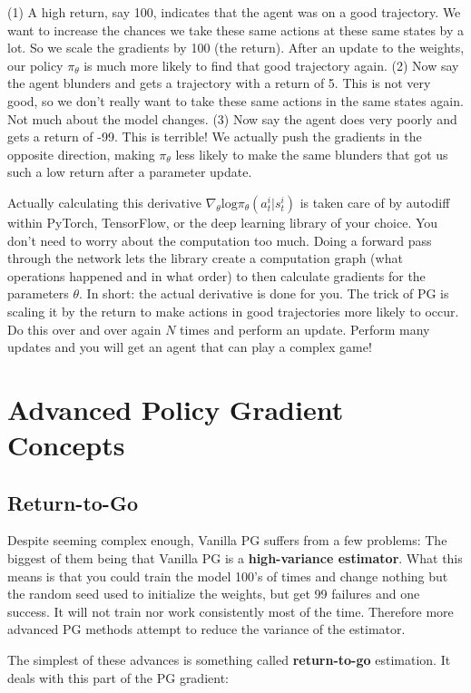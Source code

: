     (1) A high return, say 100, indicates that the agent was on a good trajectory. We want to increase the chances we take these same actions at these same states by a lot. So we scale the gradients by 100 (the return). After an update to the weights, our policy $\pi_\theta$ is much more likely to find that good trajectory again. (2) Now say the agent blunders and gets a trajectory with a return of 5. This is not very good, so we don't really want to take these same actions in the same states again. Not much about the model changes. (3) Now say the agent does very poorly and gets a return of -99. This is terrible! We actually push the gradients in the opposite direction, making $\pi_\theta$ less likely to make the same blunders that got us such a low return after a parameter update. 

    Actually calculating this derivative $\nabla_\theta \mathrm{log}\pi_\theta(a_t^i|s_t^i)$ is taken care of by autodiff within PyTorch, TensorFlow, or the deep learning library of your choice. You don't need to worry about the computation too much. Doing a forward pass through the network lets the library create a computation graph (what operations happened and in what order) to then calculate gradients for the parameters $\theta$. In short: the actual derivative is done for you. The trick of PG is scaling it by the return to make actions in good trajectories more likely to occur. Do this over and over again $N$ times and perform an update. Perform many updates and you will get an agent that can play a complex game!
\section{Advanced Policy Gradient Concepts}
\subsection{Return-to-Go}
    \large Despite seeming complex enough, Vanilla PG suffers from a few problems: The biggest of them being that Vanilla PG is a \textbf{high-variance estimator}. What this means is that you could train the model 100's of times and change nothing but the random seed used to initialize the weights, but get 99 failures and one success. It will not train nor work consistently most of the time. Therefore more advanced PG methods attempt to reduce the variance of the estimator. 

    The simplest of these advances is something called \textbf{return-to-go} estimation. It deals with this part of the PG gradient:

